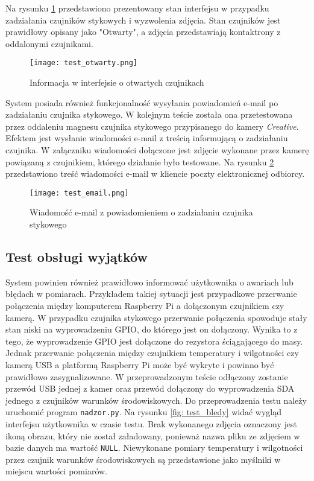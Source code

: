 \documentclass[a4paper,11pt,twoside]{article}
\begin{document}
Na rysunku \ref{fig: test_otwarty} przedstawiono prezentowany stan interfejsu w przypadku zadziałania czujników stykowych i wyzwolenia zdjęcia. Stan czujników jest prawidłowy opisany jako "Otwarty", a zdjęcia przedstawiają kontaktrony z oddalonymi czujnikami.
\begin{figure}[H]
\begin{center}
\texttt{[image: test\_otwarty.png]}
\caption{Informacja w interfejsie o otwartych czujnikach}
\label{fig: test_otwarty}
\end{center}
\end{figure}

System posiada również funkcjonalność wysyłania powiadomień e-mail po zadziałaniu czujnika stykowego. W kolejnym teście została ona przetestowana przez oddaleniu magnesu czujnika stykowego przypisanego do kamery \textit{Creative}. Efektem jest wysłanie wiadomości e-mail z treścią informującą o zadziałaniu czujnika. W załączniku wiadomości dołączone jest zdjęcie wykonane przez kamerę powiązaną z czujnikiem, którego działanie było testowane. Na rysunku \ref{fig: test_email} przedstawiono treść wiadomości e-mail w kliencie poczty elektronicznej odbiorcy.
\begin{figure}[H]
\begin{center}
\texttt{[image: test\_email.png]}
\caption{Wiadomość e-mail z powiadomieniem o zadziałaniu czujnika stykowego}
\label{fig: test_email}
\end{center}
\end{figure}

\subsection{Test obsługi wyjątków}
System powinien również prawidłowo informować użytkownika o awariach lub błędach w pomiarach. Przykładem takiej sytuacji jest przypadkowe przerwanie połączenia między komputerem Raspberry Pi a dołączonym czujnikiem czy kamerą. W przypadku czujnika stykowego przerwanie połączenia spowoduje stały stan niski na wyprowadzeniu GPIO, do którego jest on dołączony. Wynika to z tego, że wyprowadzenie GPIO jest dołączone do rezystora ściągającego do masy. Jednak przerwanie połączenia między czujnikiem temperatury i wilgotności czy kamerą USB a platformą Raspberry Pi może być wykryte i powinno być prawidłowo zasygnalizowane. W przeprowadzonym teście odłączony zostanie przewód USB jednej z kamer oraz przewód dołączony do wyprowadzenia SDA jednego z czujników warunków środowiskowych. Do przeprowadzenia testu należy uruchomić program \texttt{nadzor.py}. Na rysunku \ref{fig: test_bledy} widać wygląd interfejsu użytkownika w czasie testu. Brak wykonanego zdjęcia oznaczony jest ikoną obrazu, który nie został załadowany, ponieważ nazwa pliku ze zdjęciem w bazie danych ma wartość \texttt{NULL}. Niewykonane pomiary temperatury i wilgotności przez czujnik warunków środowiskowych są przedstawione jako myślniki w miejscu wartości pomiarów.
\end{document}
